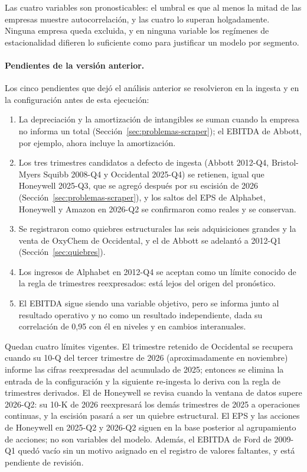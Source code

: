 \documentclass[12pt,letterpaper,oneside]{report}
\renewcommand{\_}{\UnderscoreOriginal\allowbreak}
\begin{document}
Las cuatro variables son pronosticables: el umbral es que al menos la mitad de las empresas muestre autocorrelación, y las cuatro lo superan holgadamente. Ninguna empresa queda excluida, y en ninguna variable los regímenes de estacionalidad difieren lo suficiente como para justificar un modelo por segmento.

\paragraph{Pendientes de la versión anterior.} Los cinco pendientes que dejó el análisis anterior se resolvieron en la ingesta y en la configuración antes de esta ejecución:
\begin{enumerate}
  \item La depreciación y la amortización de intangibles se suman cuando la empresa no informa un total (Sección~\ref{sec:problemas-scraper}); el EBITDA de Abbott, por ejemplo, ahora incluye la amortización.
  \item Los tres trimestres candidatos a defecto de ingesta (Abbott 2012-Q4, Bristol-Myers Squibb 2008-Q4 y Occidental 2025-Q4) se retienen, igual que Honeywell 2025-Q3, que se agregó después por su escisión de 2026 (Sección~\ref{sec:problemas-scraper}), y los saltos del EPS de Alphabet, Honeywell y Amazon en 2026-Q2 se confirmaron como reales y se conservan.
  \item Se registraron como quiebres estructurales las seis adquisiciones grandes y la venta de OxyChem de Occidental, y el de Abbott se adelantó a 2012-Q1 (Sección~\ref{sec:quiebres}).
  \item Los ingresos de Alphabet en 2012-Q4 se aceptan como un límite conocido de la regla de trimestres reexpresados: está lejos del origen del pronóstico.
  \item El EBITDA sigue siendo una variable objetivo, pero se informa junto al resultado operativo y no como un resultado independiente, dada su correlación de 0,95 con él en niveles y en cambios interanuales.
\end{enumerate}
Quedan cuatro límites vigentes. El trimestre retenido de Occidental se recupera cuando su 10-Q del tercer trimestre de 2026 (aproximadamente en noviembre) informe las cifras reexpresadas del acumulado de 2025; entonces se elimina la entrada de la configuración y la siguiente re-ingesta lo deriva con la regla de trimestres derivados. El de Honeywell se revisa cuando la ventana de datos supere 2026-Q2: su 10-K de 2026 reexpresará los demás trimestres de 2025 a operaciones continuas, y la escisión pasará a ser un quiebre estructural. El EPS y las acciones de Honeywell en 2025-Q2 y 2026-Q2 siguen en la base posterior al agrupamiento de acciones; no son variables del modelo. Además, el EBITDA de Ford de 2009-Q1 quedó vacío sin un motivo asignado en el registro de valores faltantes, y está pendiente de revisión.
\end{document}
